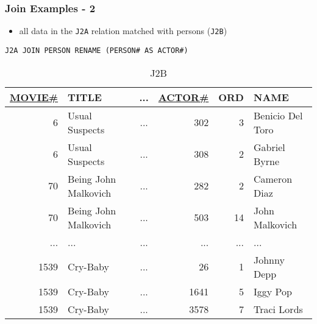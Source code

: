 \documentclass[dvipsnames]{beamer}
\theoremstyle{plain}
\begin{document}
\begin{frame}[fragile]
  \frametitle{Join Examples - 2}

  \begin{example}
    \begin{itemize}
      \item all data in the \texttt{J2A} relation matched with persons
        (\texttt{J2B})
    \end{itemize}

    \begin{lstlisting}
J2A JOIN PERSON RENAME (PERSON# AS ACTOR#)
    \end{lstlisting}

    \pause
    \vspace{-10pt}
    \begin{tiny}
    \begin{table}
      \caption{J2B}
      \begin{tabular}{|r|l|c|r|r|l|}\hline
\underline{MOVIE\#} & TITLE & ... & \underline{ACTOR\#} & ORD & NAME\\[2pt]\hline\hline
   6 & Usual Suspects       & ... &     302 &   3 & Benicio Del Toro\\\hline
   6 & Usual Suspects       & ... &     308 &   2 & Gabriel Byrne   \\\hline
  70 & Being John Malkovich & ... &     282 &   2 & Cameron Diaz    \\\hline
  70 & Being John Malkovich & ... &     503 &  14 & John Malkovich  \\\hline
 ... & ...                  & ... &     ... & ... & ...             \\\hline
1539 & Cry-Baby             & ... &      26 &   1 & Johnny Depp     \\\hline
1539 & Cry-Baby             & ... &    1641 &   5 & Iggy Pop        \\\hline
1539 & Cry-Baby             & ... &    3578 &   7 & Traci Lords     \\\hline
      \end{tabular}
    \end{table}
    \end{tiny}
  \end{example}
\end{frame}
\end{document}
